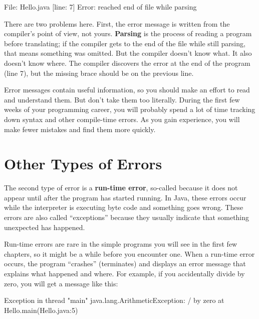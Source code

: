 \begin{stdout}
File: Hello.java  [line: 7]
Error: reached end of file while parsing
\end{stdout}


There are two problems here.
First, the error message is written from the compiler's point of view, not yours.
{\bf Parsing} is the process of reading a program before translating; if the compiler gets to the end of the file while still parsing, that means something was omitted.
But the compiler doesn't know what.
It also doesn't know where.
The compiler discovers the error at the end of the program (line 7), but the missing brace should be on the previous line.

Error messages contain useful information, so you should make an effort to read and understand them.
But don't take them too literally.
During the first few weeks of your programming career, you will probably spend a lot of time tracking down syntax and other compile-time errors.
As you gain experience, you will make fewer mistakes and find them more quickly.


\section{Other Types of Errors}
\label{exception}


The second type of error is a {\bf run-time error}, so-called because it does not appear until after the program has started running.
In Java, these errors occur while the interpreter is executing byte code and something goes wrong.
These errors are also called ``exceptions'' because they usually indicate that something unexpected has happened.

Run-time errors are rare in the simple programs you will see in the first few chapters, so it might be a while before you encounter one.
When a run-time error occurs, the program ``crashes'' (terminates) and displays an error message that explains what happened and where.
For example, if you accidentally divide by zero, you will get a message like this:

\begin{small}
\begin{stdout}
Exception in thread "main" java.lang.ArithmeticException: / by zero
    at Hello.main(Hello.java:5)
\end{stdout}
\end{small}

